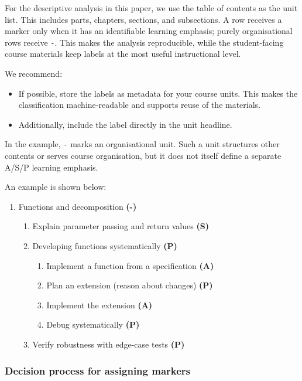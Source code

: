 \documentclass{article}
\begin{document}
For the descriptive analysis in this paper, we use the table of contents as the unit list. This includes parts, chapters, sections, and subsections. A row receives a marker only when it has an identifiable learning emphasis; purely organisational rows receive \texttt{-}. This makes the analysis reproducible, while the student-facing course materials keep labels at the most useful instructional level.

We recommend:
\begin{itemize}[leftmargin=*]
  \item If possible, store the labels as metadata for your course units. This makes the classification machine-readable and supports reuse of the materials.
  \item Additionally, include the label directly in the unit headline.
\end{itemize}


In the example, \texttt{-} marks an organisational unit. Such a unit structures other contents or serves course organisation, but it does not itself define a separate A/S/P learning emphasis.

An example is shown below:
\begin{enumerate}[leftmargin=*,label=\arabic*.]
  \item Functions and decomposition \textbf{(-)}
  \begin{enumerate}[leftmargin=*,label=\arabic{enumi}.\arabic*.]
    \item Explain parameter passing and return values \textbf{(S)}
    \item Developing functions systematically \textbf{(P)}
    \begin{enumerate}[leftmargin=*,label=\arabic{enumi}.\arabic{enumii}.\arabic*.]
      \item Implement a function from a specification \textbf{(A)}
      \item Plan an extension (reason about changes) \textbf{(P)}
      \item Implement the extension \textbf{(A)}
      \item Debug systematically \textbf{(P)}
    \end{enumerate}
    \item Verify robustness with edge-case tests \textbf{(P)}
  \end{enumerate}
\end{enumerate}
\vspace{-1mm}

\subsubsection{Decision process for assigning markers}
\end{document}
